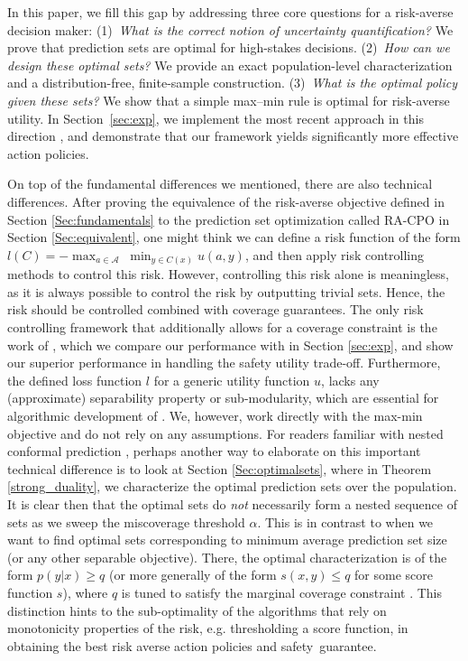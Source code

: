 In this paper, we fill this gap by addressing three core questions for a risk-averse decision maker: (1)~\emph{What is the correct notion of uncertainty quantification?} We prove that prediction sets are optimal for high-stakes decisions. (2)~\emph{How can we design these optimal sets?} We provide an exact population-level characterization and a distribution-free, finite-sample construction. (3)~\emph{What is the optimal policy given these sets?} We show that a simple max--min rule is optimal for risk-averse utility. In Section~\ref{sec:exp}, we  implement the most recent
approach in this direction \citep{cortes2024decision}, and demonstrate that our framework yields significantly more effective action policies.

On top of the fundamental differences we mentioned, there are also technical differences. After proving the equivalence of the risk-averse objective defined in Section \ref{Sec:fundamentals} to the prediction set optimization called RA-CPO in Section \ref{Sec:equivalent}, one might think we can define a risk function of the form $l(C) = - \max_{a \in \mathcal{A}}\; \min_{y \in C(x)} u(a, y)$, and then apply risk controlling methods to control this risk. However, controlling this risk alone is meaningless, as it is always possible to control the risk by outputting trivial sets. Hence, the risk should be controlled combined with coverage guarantees. The only risk controlling framework that additionally allows for a coverage constraint is the work of \citet{cortes2024decision}, which we compare our performance with  in  Section \ref{sec:exp}, and show our superior performance in handling the safety utility trade-off. Furthermore, the defined loss function $l$ for a generic utility function $u$, lacks any (approximate) separability property or sub-modularity, which are essential for algorithmic development of \citet{cortes2024decision}. We, however, work directly with the max-min objective and do not rely on any assumptions. For readers familiar with nested conformal prediction \citep{gupta2022nested}, perhaps another way to elaborate on this important technical difference is to look at Section \ref{Sec:optimalsets}, where in Theorem \ref{strong_duality}, we characterize the optimal prediction sets over the population. It is clear then that the optimal sets do \emph{not} necessarily form a nested sequence of sets as we sweep the miscoverage threshold $\alpha$. This is in contrast to when we want to find optimal sets corresponding to minimum average prediction set size (or any other separable objective). There, the optimal characterization is of the form $p(y|x) \geq q$ (or more generally of the form $s(x,y) \leq q$ for some score function $s$), where $q$ is tuned to satisfy the marginal coverage constraint \citep{lei2013distribution,sadinle2019least,kiyani2024length}. This distinction hints to the sub-optimality of the algorithms that  rely on monotonicity properties of the risk, e.g. thresholding a score function, in obtaining the best risk averse action policies and  safety~guarantee.

